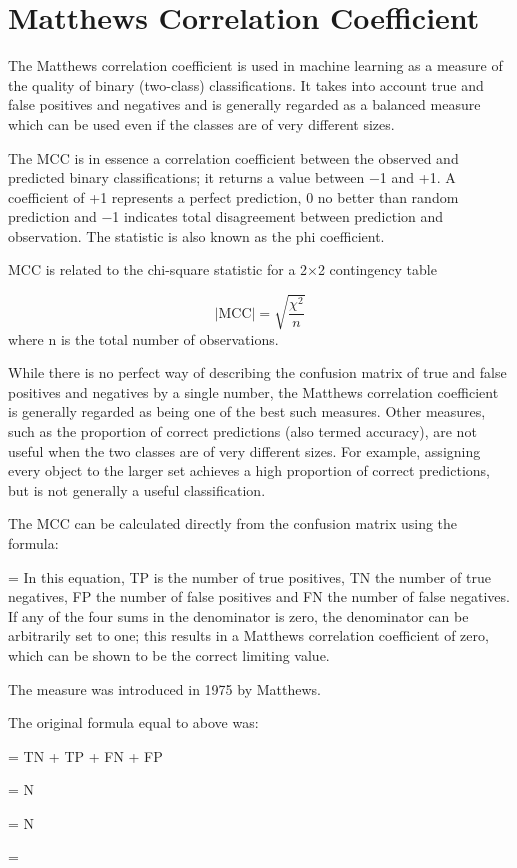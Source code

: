 ﻿\section{Matthews Correlation Coefficient}
The Matthews correlation coefficient is used in machine learning as a measure of the quality of binary (two-class) 
classifications. It takes into account true and false positives and negatives and is generally regarded as a 
balanced measure which can be used even if the classes are of very different sizes. 

The MCC is in essence a correlation coefficient between the observed and predicted binary classifications; 
it returns a value between −1 and +1. A coefficient of +1 represents a perfect prediction, 0 no better than 
random prediction and −1 indicates total disagreement between prediction and observation. 
The statistic is also known as the phi coefficient. 

MCC is related to the chi-square statistic for a 2×2 contingency table

\[ |\text{MCC}| = \sqrt{\frac{\chi^2}{n}}\]
where n is the total number of observations.

While there is no perfect way of describing the confusion matrix of true and false positives and negatives by a single number, the Matthews correlation coefficient is generally regarded as being one of the best such measures. Other measures, such as the proportion of correct predictions (also termed accuracy), are not useful when the two classes are of very different sizes. For example, assigning every object to the larger set achieves a high proportion of correct predictions, but is not generally a useful classification.

The MCC can be calculated directly from the confusion matrix using the formula:


 =  { }
In this equation, TP is the number of true positives, TN the number of true negatives, FP the number of false positives and FN the number of false negatives. If any of the four sums in the denominator is zero, the denominator can be arbitrarily set to one; this results in a Matthews correlation coefficient of zero, which can be shown to be the correct limiting value.

The measure was introduced in 1975 by Matthews. 


The original formula equal to above was:


  = TN + TP + FN + FP

 =  { N }

 =  { N }

 =  { }
